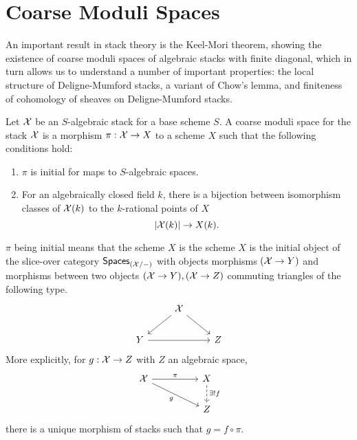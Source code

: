 \section{Coarse Moduli Spaces}\label{sec: coarse moduli spaces}
An important result in stack theory is the Keel-Mori theorem, showing the existence of coarse moduli spaces of algebraic stacks with finite diagonal, which in turn allows us to understand a number of important properties: the local structure of Deligne-Mumford stacks, a variant of Chow's lemma, and finiteness of cohomology of sheaves on Deligne-Mumford stacks. 
\begin{definition}\label{def: coarse moduli space}
    Let $\mathcal{X}$ be an $S$-algebraic stack for a base scheme $S$. A coarse moduli space for the stack $\mathcal{X}$ is a morphism $\pi:\mathcal{X}\to X$ to a scheme $X$ such that the following conditions hold:
    \begin{enumerate}[label=(\alph*)]
        \item $\pi$ is initial for maps to $S$-algebraic spaces. 
        \item For an algebraically closed field $k$, there is a bijection between isomorphism classes of $\mathcal{X}(k)$ to the $k$-rational points of $X$
        $$\left|\mathcal{X}(k)\right|\to X(k).$$
    \end{enumerate}
\end{definition}
\begin{remark}
    $\pi$ being initial means that the scheme $X$ is the scheme $X$ is the initial object of the slice-over category $\mathsf{Spaces}_{(\mathcal{X}/-)}$ with objects morphisms $(\mathcal{X}\to Y)$ and morphisms between two objects $(\mathcal{X}\to Y), (\mathcal{X}\to Z)$ commuting triangles of the following type. 
    $$%
    \begin{tikzcd}
        & \Xcal \\
        Y && Z
        \arrow[from=1-2, to=2-1]
        \arrow[from=2-1, to=2-3]
        \arrow[from=1-2, to=2-3]
    \end{tikzcd}$$
    More explicitly, for $g:\mathcal{X}\to Z$ with $Z$ an algebraic space, 
    $$%
    \begin{tikzcd}
        \Xcal && X \\
        && Z
        \arrow["g"', from=1-1, to=2-3]
        \arrow["\pi", from=1-1, to=1-3]
        \arrow["{\exists!f}", dashed, from=1-3, to=2-3]
    \end{tikzcd}$$
    there is a unique morphism of stacks such that $g=f\circ\pi$. 
\end{remark}
